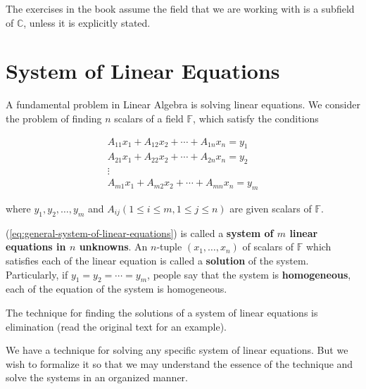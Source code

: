The exercises in the book assume the field that we are working with is a subfield of $\mathbb{C}$, unless it is explicitly stated.

\section{System of Linear Equations}

A fundamental problem in Linear Algebra is solving linear equations. We consider the problem of finding $n$ scalars of a field $\mathbb{F}$, which satisfy the conditions

\begin{equation}
    \begin{split}
        A_{11}x_{1} + A_{12}x_{2} + \cdots + A_{1n}x_{n} = y_{1}  \\
        A_{21}x_{1} + A_{22}x_{2} + \cdots + A_{2n}x_{n} = y_{2}  \\
        \vdots \\
        A_{m1}x_{1} + A_{m2}x_{2} + \cdots + A_{mn}x_{n} = y_{m}
    \end{split}\label{eq:general-system-of-linear-equations}
\end{equation}

where $y_{1}, y_{2}, \ldots, y_{m}$ and $A_{ij} (1\le i\le m, 1\le j\le n)$ are given scalars of $\mathbb{F}$.

(\ref{eq:general-system-of-linear-equations}) is called a \textbf{system of $m$ linear equations in $n$ unknowns}. An $n$-tuple $(x_{1}, \ldots, x_{n})$ of scalars of $\mathbb{F}$ which satisfies each of the linear equation is called a \textbf{solution} of the system. Particularly, if $y_{1} = y_{2} = \cdots = y_{m}$, people say that the system is \textbf{homogeneous}, each of the equation of the system is homogeneous.

The technique for finding the solutions of a system of linear equations is elimination (read the original text for an example).

We have a technique for solving any specific system of linear equations. But we wish to formalize it so that we may understand the essence of the technique and solve the systems in an organized manner.

